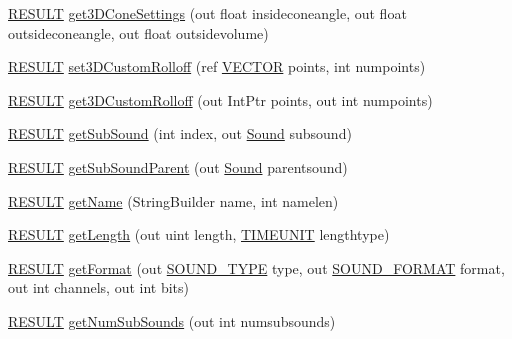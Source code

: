 \begin{DoxyCompactItemize}
\hyperlink{namespace_f_m_o_d_a305d1176ef3f8c8815861a60407ac33d}{R\+E\+S\+U\+LT} \hyperlink{class_f_m_o_d_1_1_sound_a7ce178e6903b29ea584e8619d750e59c}{get3\+D\+Cone\+Settings} (out float insideconeangle, out float outsideconeangle, out float outsidevolume)
\item 
\hyperlink{namespace_f_m_o_d_a305d1176ef3f8c8815861a60407ac33d}{R\+E\+S\+U\+LT} \hyperlink{class_f_m_o_d_1_1_sound_a5421296ff25765c7bcb0d619535ef300}{set3\+D\+Custom\+Rolloff} (ref \hyperlink{struct_f_m_o_d_1_1_v_e_c_t_o_r}{V\+E\+C\+T\+OR} points, int numpoints)
\item 
\hyperlink{namespace_f_m_o_d_a305d1176ef3f8c8815861a60407ac33d}{R\+E\+S\+U\+LT} \hyperlink{class_f_m_o_d_1_1_sound_a41fea52587d2ddbf5dc2e7d37f9210e9}{get3\+D\+Custom\+Rolloff} (out Int\+Ptr points, out int numpoints)
\item 
\hyperlink{namespace_f_m_o_d_a305d1176ef3f8c8815861a60407ac33d}{R\+E\+S\+U\+LT} \hyperlink{class_f_m_o_d_1_1_sound_ae3794b3962bccc1fbd27bfc41748b627}{get\+Sub\+Sound} (int index, out \hyperlink{class_f_m_o_d_1_1_sound}{Sound} subsound)
\item 
\hyperlink{namespace_f_m_o_d_a305d1176ef3f8c8815861a60407ac33d}{R\+E\+S\+U\+LT} \hyperlink{class_f_m_o_d_1_1_sound_a0ac34eece385d2dfd82ad0e1f9de9d51}{get\+Sub\+Sound\+Parent} (out \hyperlink{class_f_m_o_d_1_1_sound}{Sound} parentsound)
\item 
\hyperlink{namespace_f_m_o_d_a305d1176ef3f8c8815861a60407ac33d}{R\+E\+S\+U\+LT} \hyperlink{class_f_m_o_d_1_1_sound_a70c55e1a1267bc319381f2581591aba6}{get\+Name} (String\+Builder name, int namelen)
\item 
\hyperlink{namespace_f_m_o_d_a305d1176ef3f8c8815861a60407ac33d}{R\+E\+S\+U\+LT} \hyperlink{class_f_m_o_d_1_1_sound_a8112459af81ffa81fff8ad3d2e8589b3}{get\+Length} (out uint length, \hyperlink{namespace_f_m_o_d_aff20975332f93ff2180d2681cb43929f}{T\+I\+M\+E\+U\+N\+IT} lengthtype)
\item 
\hyperlink{namespace_f_m_o_d_a305d1176ef3f8c8815861a60407ac33d}{R\+E\+S\+U\+LT} \hyperlink{class_f_m_o_d_1_1_sound_ac5fb06924194ded5e5687fc1e511b777}{get\+Format} (out \hyperlink{namespace_f_m_o_d_a46aa34a9d7b9a92de83721cd8fbfa028}{S\+O\+U\+N\+D\+\_\+\+T\+Y\+PE} type, out \hyperlink{namespace_f_m_o_d_a06713fa43379f081fa76373fa12b8d7d}{S\+O\+U\+N\+D\+\_\+\+F\+O\+R\+M\+AT} format, out int channels, out int bits)
\item 
\hyperlink{namespace_f_m_o_d_a305d1176ef3f8c8815861a60407ac33d}{R\+E\+S\+U\+LT} \hyperlink{class_f_m_o_d_1_1_sound_ad706757c6faea248669db0c346e346b2}{get\+Num\+Sub\+Sounds} (out int numsubsounds)

\end{DoxyCompactItemize}
